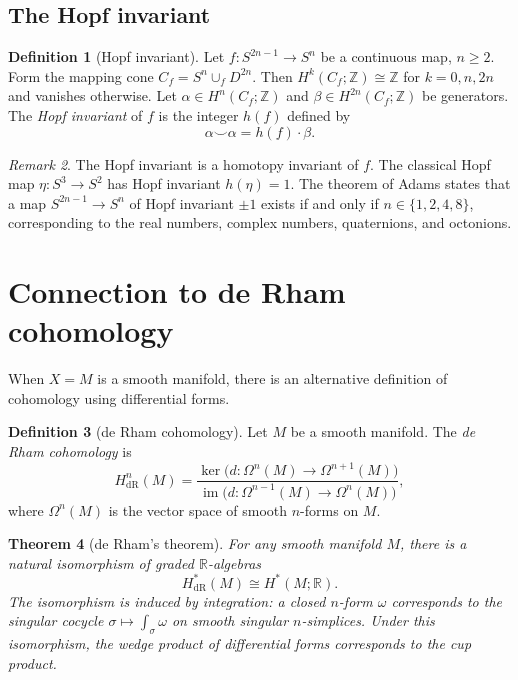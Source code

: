 \documentclass[12pt,a4paper,openany]{book}
\theoremstyle{definition}
\newtheorem{definition}{Definition}[chapter]
\theoremstyle{plain}
\newtheorem{theorem}[definition]{Theorem}
\theoremstyle{remark}
\newtheorem{remark}[definition]{Remark}
\newcommand{\Z}{\mathbb{Z}}
\newcommand{\R}{\mathbb{R}}
\DeclareMathOperator{\im}{im}
\begin{document}
\subsection{The Hopf invariant}
\label{subsec:hopf-invariant}

\begin{definition}[Hopf invariant]
Let $f\colon S^{2n-1}\to S^n$ be a continuous map, $n\geq 2$. Form the
mapping cone $C_f = S^n\cup_f D^{2n}$. Then
$H^k(C_f;\Z)\cong\Z$ for $k=0,n,2n$ and vanishes otherwise.
Let $\alpha\in H^n(C_f;\Z)$ and $\beta\in H^{2n}(C_f;\Z)$ be
generators. The \emph{Hopf invariant} of $f$ is the integer $h(f)$
defined by
\[
  \alpha\smile\alpha = h(f)\cdot\beta.
\]
\end{definition}

\begin{remark}
The Hopf invariant is a homotopy invariant of $f$. The classical Hopf
map $\eta\colon S^3\to S^2$ has Hopf invariant $h(\eta)=1$. The theorem
of Adams states that a map $S^{2n-1}\to S^n$ of Hopf invariant $\pm 1$
exists if and only if $n\in\{1,2,4,8\}$, corresponding to the real
numbers, complex numbers, quaternions, and octonions.
\end{remark}

\section{Connection to de Rham cohomology}
\label{sec:derham}

When $X=M$ is a smooth manifold, there is an alternative definition
of cohomology using differential forms.

\begin{definition}[de Rham cohomology]
Let $M$ be a smooth manifold. The \emph{de Rham cohomology} is
\[
  H^n_{\mathrm{dR}}(M) = \frac{\ker\bigl(d\colon\Omega^n(M)\to\Omega^{n+1}(M)\bigr)}
    {\im\bigl(d\colon\Omega^{n-1}(M)\to\Omega^n(M)\bigr)},
\]
where $\Omega^n(M)$ is the vector space of smooth $n$-forms on $M$.
\end{definition}

\begin{theorem}[de Rham's theorem]\label{thm:deRham}
For any smooth manifold $M$, there is a natural isomorphism of graded
$\R$-algebras
\[
  H^*_{\mathrm{dR}}(M) \cong H^*(M;\R).
\]
The isomorphism is induced by integration: a closed $n$-form $\omega$
corresponds to the singular cocycle
$\sigma\mapsto\int_\sigma\omega$ on smooth singular $n$-simplices.
Under this isomorphism, the wedge product of differential forms
corresponds to the cup product.
\end{theorem}
\end{document}
